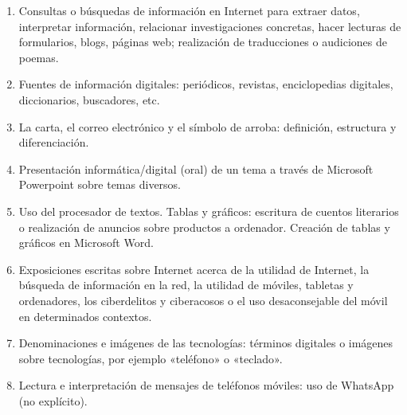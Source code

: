 \documentclass{textolivre}
\begin{document}
\begin{enumerate}
    \item Consultas o búsquedas de información en Internet para extraer datos, interpretar información, relacionar investigaciones concretas, hacer lecturas de formularios, blogs, páginas web; realización de traducciones o audiciones de poemas.
    \item Fuentes de información digitales: periódicos, revistas, enciclopedias digitales, diccionarios, buscadores, etc.
    \item La carta, el correo electrónico y el símbolo de arroba: definición, estructura y diferenciación.
    \item Presentación informática/digital (oral) de un tema a través de Microsoft Powerpoint sobre temas diversos.
    \item Uso del procesador de textos. Tablas y gráficos: escritura de cuentos literarios o realización de anuncios sobre productos a ordenador. Creación de tablas y gráficos en Microsoft Word. 
    \item Exposiciones escritas sobre Internet acerca de la utilidad de Internet, la búsqueda de información en la red, la utilidad de móviles, tabletas y ordenadores, los ciberdelitos y ciberacosos o el uso desaconsejable del móvil en determinados contextos.
    \item Denominaciones e imágenes de las tecnologías: términos digitales o imágenes sobre tecnologías, por ejemplo «teléfono» o «teclado».
    \item Lectura e interpretación de mensajes de teléfonos móviles: uso de WhatsApp (no explícito).
\end{enumerate}
\end{document}
